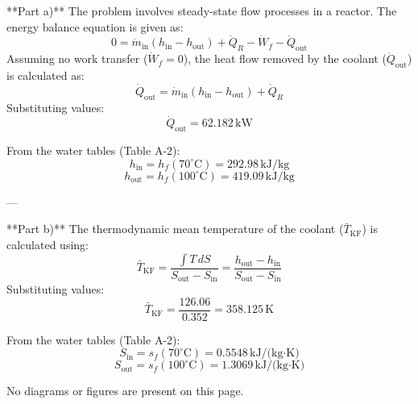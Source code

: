**Part a)**  
The problem involves steady-state flow processes in a reactor. The energy balance equation is given as:  
\[
0 = \dot{m}_{\text{in}} (h_{\text{in}} - h_{\text{out}}) + \dot{Q}_R - \dot{W}_f - \dot{Q}_{\text{out}}
\]  
Assuming no work transfer (\( \dot{W}_f = 0 \)), the heat flow removed by the coolant (\( \dot{Q}_{\text{out}} \)) is calculated as:  
\[
\dot{Q}_{\text{out}} = \dot{m}_{\text{in}} (h_{\text{in}} - h_{\text{out}}) + \dot{Q}_R
\]  
Substituting values:  
\[
\dot{Q}_{\text{out}} = 62.182 \, \text{kW}
\]  

From the water tables (Table A-2):  
\[
h_{\text{in}} = h_f(70^\circ\text{C}) = 292.98 \, \text{kJ/kg}
\]  
\[
h_{\text{out}} = h_f(100^\circ\text{C}) = 419.09 \, \text{kJ/kg}
\]  

---

**Part b)**  
The thermodynamic mean temperature of the coolant (\( \bar{T}_{\text{KF}} \)) is calculated using:  
\[
\bar{T}_{\text{KF}} = \frac{\int T \, dS}{S_{\text{out}} - S_{\text{in}}} = \frac{h_{\text{out}} - h_{\text{in}}}{S_{\text{out}} - S_{\text{in}}}
\]  
Substituting values:  
\[
\bar{T}_{\text{KF}} = \frac{126.06}{0.352} = 358.125 \, \text{K}
\]  

From the water tables (Table A-2):  
\[
S_{\text{in}} = s_f(70^\circ\text{C}) = 0.5548 \, \text{kJ/(kg·K)}
\]  
\[
S_{\text{out}} = s_f(100^\circ\text{C}) = 1.3069 \, \text{kJ/(kg·K)}
\]  

No diagrams or figures are present on this page.